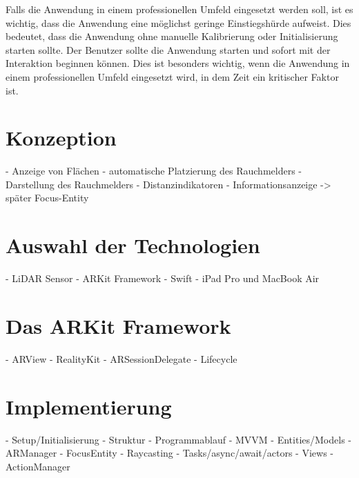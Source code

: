 Falls die Anwendung in einem professionellen Umfeld eingesetzt werden soll, ist es wichtig, dass die Anwendung eine möglichst geringe Einstiegshürde aufweist. Dies bedeutet, dass die Anwendung ohne manuelle Kalibrierung oder Initialisierung starten sollte. Der Benutzer sollte die Anwendung starten und sofort mit der Interaktion beginnen können. Dies ist besonders wichtig, wenn die Anwendung in einem professionellen Umfeld eingesetzt wird, in dem Zeit ein kritischer Faktor ist.

\section{Konzeption}
- Anzeige von Flächen
- automatische Platzierung des Rauchmelders
- Darstellung des Rauchmelders
- Distanzindikatoren
- Informationsanzeige
-> später Focus-Entity

\section{Auswahl der Technologien}
- LiDAR Sensor
- ARKit Framework
- Swift
- iPad Pro und MacBook Air

\section{Das ARKit Framework}
- ARView
- RealityKit
- ARSessionDelegate
- Lifecycle

\section{Implementierung}
- Setup/Initialisierung
- Struktur
- Programmablauf
- MVVM
- Entities/Models
- ARManager
- FocusEntity
- Raycasting
- Tasks/async/await/actors
- Views
- ActionManager
